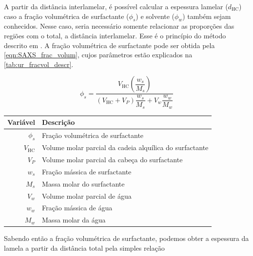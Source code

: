 		A partir da distância interlamelar, é possível calcular a espessura lamelar (\(d_{\text{HC}}\)) caso a fração volumétrica de surfactante (\(\phi_s\)) e solvente (\(\phi_w\)) também sejam conhecidos. Nesse caso, seria necessário somente relacionar as proporções das regiões com o total, a distância interlamelar. Esse é o princípio do método descrito em \citeauthor{Ferreira2016}. A fração volumétrica de surfactante pode ser obtida pela \autoref{eqn:SAXS_frac_volum}, cujos parâmetros estão explicados na \autoref{tab:ur_fracvol_descr}. 
		
		\begin{equation}
			\phi_s = \dfrac{V_{\textrm{HC}}\left( \dfrac{w_{s}}{M_{s}} \right)}{\left( V_{\textrm{HC}} + V_{P} \right)\dfrac{w_{s}}{M_{s}} + V_{w}\dfrac{w_{w}}{M_{w}}}
			\label{eqn:SAXS_frac_volum}
		\end{equation}
		
		\begin{table}[h]
			{\begin{tabular}{r l}
				\toprule
				           Variável & Descrição                                               \\ \midrule
				         \(\phi_s\) & Fração volumétrica de surfactante                       \\
				\(V_{\mathrm{HC}}\) & Volume molar parcial da cadeia alquílica do surfactante \\
				          \(V_{P}\) & Volume molar parcial da cabeça do surfactante           \\
				          \(w_{s}\) & Fração mássica de surfactante                           \\
				          \(M_{s}\) & Massa molar do surfactante                              \\ \midrule
				          \(V_{w}\) & Volume molar parcial de água                            \\
				          \(w_{w}\) & Fração mássica de água                                  \\
				          \(M_{w}\) & Massa molar da água                                     \\ \bottomrule
			\end{tabular}
			}%
			{}%
		\end{table}

		Sabendo então a fração volumétrica de surfactante, podemos obter a espessura da lamela a partir da distância total pela simples relação \cite{Ferreira2016}
		
